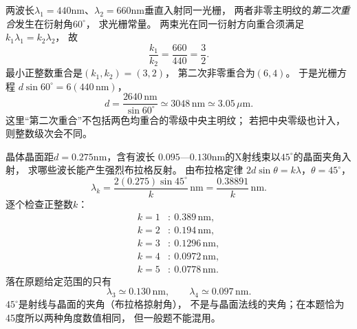 \problemtext 两波长$\lambda_1=440$nm、$\lambda_2=660$nm垂直入射同一光栅，
两者非零主明纹的\emph{第二次重合}发生在衍射角$60^\circ$，
求光栅常量。
\workings
两束光在同一衍射方向重合须满足
$k_1\lambda_1=k_2\lambda_2$，
故
\[
\frac{k_1}{k_2}=\frac{660}{440}=\frac32.
\]
最小正整数重合是$(k_1,k_2)=(3,2)$，
第二次非零重合为$(6,4)$。
于是光栅方程
$d\sin60^\circ=6(440\,\mathrm{nm})$，
\[
\boxed{d=\frac{2640\,\mathrm{nm}}{\sin60^\circ}
\simeq3048\,\mathrm{nm}\simeq3.05\,\mu\mathrm m}.
\]
\crosscheck 这里“第二次重合”不包括两色均重合的零级中央主明纹；
若把中央零级也计入，则整数级次会不同。

\problemtext 晶体晶面距$d=0.275$nm，含有波长
$0.095$—$0.130$nm的X射线束以$45^\circ$的晶面夹角入射，
求哪些波长能产生强烈布拉格反射。
\workings
由布拉格定律
$2d\sin\theta=k\lambda$，$\theta=45^\circ$，
\[
\lambda_k=\frac{2(0.275)\sin45^\circ}{k}\,\mathrm{nm}
=\frac{0.38891}{k}\,\mathrm{nm}.
\]
逐个检查正整数$k$：
\[
\begin{aligned}
k=1&:\ 0.389\,\mathrm{nm},\\
k=2&:\ 0.194\,\mathrm{nm},\\
k=3&:\ 0.1296\,\mathrm{nm},\\
k=4&:\ 0.0972\,\mathrm{nm},\\
k=5&:\ 0.0778\,\mathrm{nm}.
\end{aligned}
\]
落在原题给定范围的只有
\[
\boxed{\lambda_3\simeq0.130\,\mathrm{nm}},\qquad
\boxed{\lambda_4\simeq0.097\,\mathrm{nm}}.
\]
\crosscheck $45^\circ$是射线与晶面的夹角（布拉格掠射角），
不是与晶面法线的夹角；在本题恰为45度所以两种角度数值相同，
但一般题不能混用。
